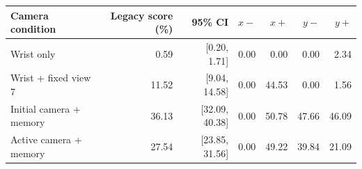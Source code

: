 \begin{tabular}{lrrrrrr}
\hline
Camera condition & Legacy score (\%) & 95\% CI & $x-$ & $x+$ & $y-$ & $y+$ \\
\hline
Wrist only & 0.59 & [0.20, 1.71] & 0.00 & 0.00 & 0.00 & 2.34 \\
Wrist + fixed view 7 & 11.52 & [9.04, 14.58] & 0.00 & 44.53 & 0.00 & 1.56 \\
Initial camera + memory & 36.13 & [32.09, 40.38] & 0.00 & 50.78 & 47.66 & 46.09 \\
Active camera + memory & 27.54 & [23.85, 31.56] & 0.00 & 49.22 & 39.84 & 21.09 \\
\hline
\end{tabular}

